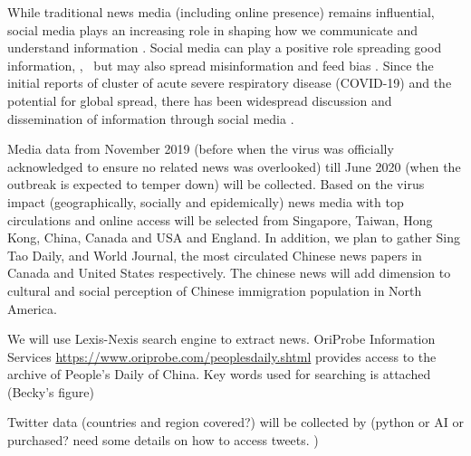 While traditional news media (including online presence) remains influential,  social media plays an increasing role in shaping how we communicate and understand information \citep{LiuSieg19}. Social media can play a positive role spreading good information, \cite{BascHill20, SunYang20,AhmeQuin18},  but may also spread misinformation and feed bias \citep{ChouOa18, McKevanS19}.  Since the initial reports of cluster of acute severe respiratory disease (COVID-19) and the potential for global spread, there has been widespread discussion and dissemination of information through social media \citep{?}.






Media data from November 2019 (before when the virus was officially acknowledged to ensure no related news was overlooked) till June 2020 (when the outbreak is expected to temper down) will be collected.  Based on the virus impact (geographically, socially and epidemically) news media with top circulations and online access will be selected from Singapore, Taiwan, Hong Kong, China, Canada and USA and England. In addition, we plan to gather Sing Tao Daily, and World Journal, the most circulated Chinese news papers in Canada and United States respectively.  The chinese news will add dimension to cultural and social perception  of Chinese immigration population in North America.

We will use Lexis-Nexis search engine to extract news.  OriProbe Information Services \url{https://www.oriprobe.com/peoplesdaily.shtml} provides access to the archive of People’s Daily of China.  Key words used for searching is attached (Becky’s figure) 

Twitter data (countries and region covered?) will be collected by (python or AI or purchased? need some details on how to access tweets. ) 


